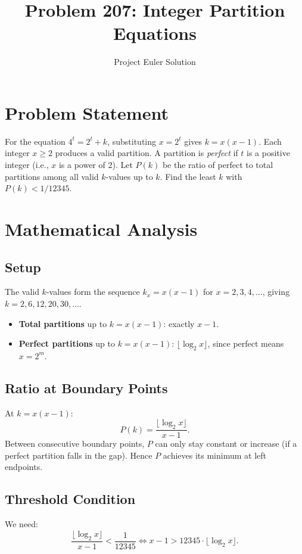 \documentclass[12pt]{article}
\title{Problem 207: Integer Partition Equations}
\author{Project Euler Solution}
\date{}
\begin{document}
\maketitle

\section{Problem Statement}
For the equation $4^t = 2^t + k$, substituting $x = 2^t$ gives $k = x(x-1)$. Each integer $x \geq 2$ produces a valid partition. A partition is \emph{perfect} if $t$ is a positive integer (i.e., $x$ is a power of 2). Let $P(k)$ be the ratio of perfect to total partitions among all valid $k$-values up to $k$. Find the least $k$ with $P(k) < 1/12345$.

\section{Mathematical Analysis}

\subsection{Setup}
The valid $k$-values form the sequence $k_x = x(x-1)$ for $x = 2, 3, 4, \ldots$, giving $k = 2, 6, 12, 20, 30, \ldots$.

\begin{itemize}
    \item \textbf{Total partitions} up to $k = x(x-1)$: exactly $x - 1$.
    \item \textbf{Perfect partitions} up to $k = x(x-1)$: $\lfloor \log_2 x \rfloor$, since perfect means $x = 2^m$.
\end{itemize}

\subsection{Ratio at Boundary Points}
At $k = x(x-1)$:
\[
P(k) = \frac{\lfloor \log_2 x \rfloor}{x - 1}.
\]
Between consecutive boundary points, $P$ can only stay constant or increase (if a perfect partition falls in the gap). Hence $P$ achieves its minimum at left endpoints.

\subsection{Threshold Condition}
We need:
\[
\frac{\lfloor \log_2 x \rfloor}{x - 1} < \frac{1}{12345} \iff x - 1 > 12345 \cdot \lfloor \log_2 x \rfloor.
\]
\end{document}
